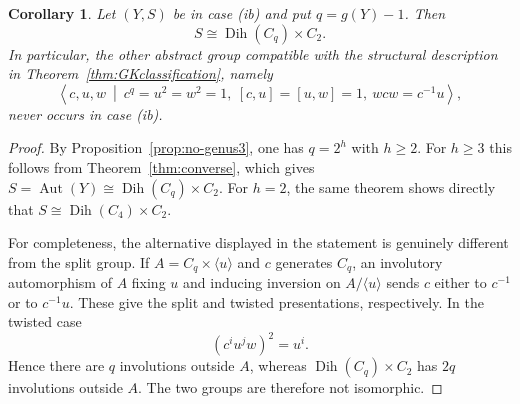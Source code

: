 \documentclass[11pt]{article}
\newtheorem{corollary}[theorem]{Corollary}
\theoremstyle{remark}
\newcommand{\Aut}{\operatorname{Aut}}
\newcommand{\Dih}{\operatorname{Dih}}
\begin{document}
\begin{corollary}\label{cor:ib-group}
Let $(Y,S)$ be in case \textup{(ib)} and put $q=g(Y)-1$.  Then
\[
        S\cong\Dih(C_q)\times C_2.
\]
In particular, the other abstract group compatible with the structural
description in Theorem~\ref{thm:GKclassification}, namely
\[
 \left\langle c,u,w\ \middle|\
 c^q=u^2=w^2=1,\ [c,u]=[u,w]=1,\ wcw=c^{-1}u
 \right\rangle,
\]
never occurs in case \textup{(ib)}.
\end{corollary}

\begin{proof}
By Proposition~\ref{prop:no-genus3}, one has $q=2^h$ with $h\ge2$.
For $h\ge3$ this follows from Theorem~\ref{thm:converse}, which gives
$S=\Aut(Y)\cong\Dih(C_q)\times C_2$.  For $h=2$, the same theorem
shows directly that $S\cong\Dih(C_4)\times C_2$.

For completeness, the alternative displayed in the statement is genuinely
different from the split group.  If $A=C_q\times\langle u\rangle$ and
$c$ generates $C_q$, an involutory automorphism of $A$ fixing $u$ and
inducing inversion on $A/\langle u\rangle$ sends $c$ either to $c^{-1}$
or to $c^{-1}u$.  These give the split and twisted presentations,
respectively.  In the twisted case
\[
        (c^iu^jw)^2=u^i.
\]
Hence there are $q$ involutions outside $A$, whereas
$\Dih(C_q)\times C_2$ has $2q$ involutions outside $A$.  The two groups
are therefore not isomorphic.
\end{proof}
\end{document}
